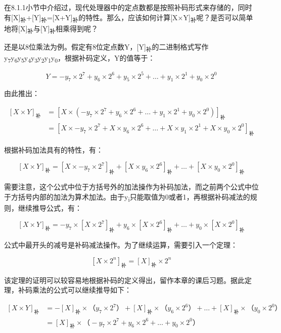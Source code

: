 \documentclass[]{ctexbook}
\begin{document}
在8.1.1小节中介绍过，现代处理器中的定点数都是按照补码形式来存储的，同时有{[}X{]}\textsubscript{补}+{[}Y{]}\textsubscript{补}={[}X+Y{]}\textsubscript{补}的特性。那么，应该如何计算{[}X×Y{]}\textsubscript{补}呢？是否可以简单地将{[}X{]}\textsubscript{补}与{[}Y{]}\textsubscript{补}相乘得到呢？

还是以8位乘法为例。假定有8位定点数Y，{[}Y{]}\textsubscript{补}的二进制格式写作y\textsubscript{7}y\textsubscript{6}y\textsubscript{5}y\textsubscript{4}y\textsubscript{3}y\textsubscript{2}y\textsubscript{1}y\textsubscript{0}，根据补码定义，Y的值等于：

\[Y=-y_{7}\times 2^{7}+y_{6}\times 2^{6}+y_{5}\times 2^{5}+\ldots +y_{1}\times 2^{1}+y_{0}\times 2^{0}\]

由此推出：

\[\begin{aligned}[X\times Y]_{\mbox{补}}&=[X\times (-y_{7}\times 2^{7}+y_{6}\times 2^{6}+\ldots +y_{1}\times 2^{1}+y_{0}\times 2^{0})]_{\mbox{补}} \\ &=[X\times -y_{7}\times 2^{7}+X\times y_{6}\times 2^{6}+\ldots +X\times y_{1}\times 2^{1}+X\times y_{0}\times 2^{0}]_{\mbox{补}}\end{aligned}\]

根据补码加法具有的特性，有：

\[[X\times Y]_{\mbox{补}}=[X\times -y_{7}\times 2^{7}]_{\mbox{补}}+[X\times y_{6}\times 2^{6}]_{\mbox{补}}+\ldots +[X\times y_{0}\times 2^{0}]_{\mbox{补}}\]

需要注意，这个公式中位于方括号外的加法操作为补码加法，而之前两个公式中位于方括号内部的加法为算术加法。由于y\textsubscript{i}只能取值为0或者1，再根据补码减法的规则，继续推导公式，有：

\[[X\times Y]_{\mbox{补}}=-y_{7}\times [X\times 2^{7}]_{\mbox{补}}+y_{6}\times [X\times 2^{6}]_{\mbox{补}}+\ldots +y_{0}\times [X\times 2^{0}]_{\mbox{补}}\]

公式中最开头的减号是补码减法操作。为了继续运算，需要引入一个定理：

\[[X\times 2^{n}]_{\mbox{补}}=[X]_{\mbox{补}}\times 2^{n}\]

该定理的证明可以较容易地根据补码的定义得出，留作本章的课后习题。据此定理，补码乘法的公式可以继续推导如下：

\[\begin{aligned}[X\times Y]_{\mbox{补}}&=-[X]_{\mbox{补}}\times （y_{7}\times 2^{7}）+[X]_{\mbox{补}}\times （y_{6}\times 2^{6}）+\ldots +[X]_{\mbox{补}}\times （y_{0}\times 2^{0}）\\ &=[X]_{\mbox{补}}\times （-y_{7}\times 2^{7}+y_{6}\times 2^{6}+\ldots +y_{0}\times 2^{0}）\end{aligned}\]
\end{document}
